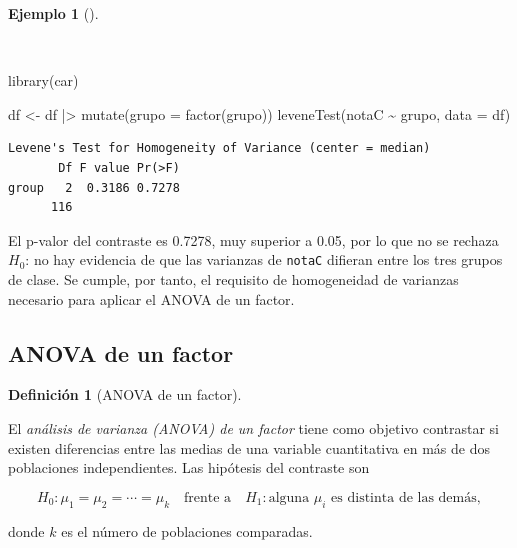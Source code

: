 \documentclass[
  spanish,
  a4paper,
]{scrreport}
\newenvironment{Shaded}{\begin{snugshade}}{\end{snugshade}}
\newcommand{\AttributeTok}[1]{\textcolor[rgb]{0.40,0.45,0.13}{#1}}
\newcommand{\FunctionTok}[1]{\textcolor[rgb]{0.28,0.35,0.67}{#1}}
\newcommand{\NormalTok}[1]{\textcolor[rgb]{0.00,0.23,0.31}{#1}}
\newcommand{\OtherTok}[1]{\textcolor[rgb]{0.00,0.23,0.31}{#1}}
\newcommand{\SpecialCharTok}[1]{\textcolor[rgb]{0.37,0.37,0.37}{#1}}
\theoremstyle{definition}
\newtheorem{example}{Ejemplo}[chapter]
\theoremstyle{definition}
\newtheorem{definition}{Definición}[chapter]
\theoremstyle{remark}
\begin{document}
\begin{example}[]\protect\hypertarget{exm-masdosindep-levene}{}\label{exm-masdosindep-levene}

~

\begin{Shaded}
\begin{Highlighting}[]
\FunctionTok{library}\NormalTok{(car)}

\NormalTok{df }\OtherTok{\textless{}{-}}\NormalTok{ df }\SpecialCharTok{|\textgreater{}} \FunctionTok{mutate}\NormalTok{(}\AttributeTok{grupo =} \FunctionTok{factor}\NormalTok{(grupo))}
\FunctionTok{leveneTest}\NormalTok{(notaC }\SpecialCharTok{\textasciitilde{}}\NormalTok{ grupo, }\AttributeTok{data =}\NormalTok{ df)}
\end{Highlighting}
\end{Shaded}

\begin{verbatim}
Levene's Test for Homogeneity of Variance (center = median)
       Df F value Pr(>F)
group   2  0.3186 0.7278
      116               
\end{verbatim}

El p-valor del contraste es 0.7278, muy superior a 0.05, por lo que no
se rechaza \(H_0\): no hay evidencia de que las varianzas de
\texttt{notaC} difieran entre los tres grupos de clase. Se cumple, por
tanto, el requisito de homogeneidad de varianzas necesario para aplicar
el ANOVA de un factor.

\end{example}

\subsection{ANOVA de un factor}\label{anova-de-un-factor}

\begin{definition}[ANOVA de un
factor]\protect\hypertarget{def-masdosindep-anova}{}\label{def-masdosindep-anova}

El \emph{análisis de varianza (ANOVA) de un factor} tiene como objetivo
contrastar si existen diferencias entre las medias de una variable
cuantitativa en más de dos poblaciones independientes. Las hipótesis del
contraste son

\[H_0: \mu_1=\mu_2=\cdots=\mu_k \quad \text{frente a} \quad H_1: \text{alguna } \mu_i \text{ es distinta de las demás},\]

donde \(k\) es el número de poblaciones comparadas.

\end{definition}
\end{document}

